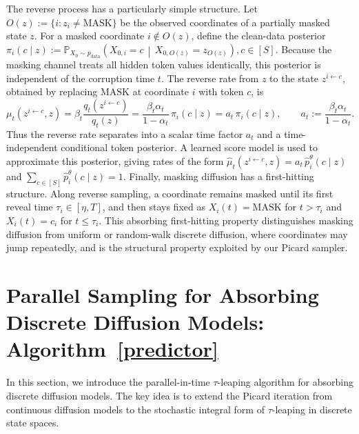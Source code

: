 \documentclass{article}
\begin{document}
The reverse process has a particularly simple structure.  Let $O(z):=\{i:z_i\neq \mathrm{MASK}\}$
be the observed coordinates of a partially masked state \(z\).  For a masked coordinate \(i\notin O(z)\), define the clean-data posterior $\pi_i(c\mid z)
    :=
    \mathbb P_{X_0\sim p_{\mathrm{data}}}
    \!\left(
    X_{0,i}=c
    \,\middle|\,
    X_{0,O(z)}=z_{O(z)}
    \right), c\in[S].$
Because the masking channel treats all hidden token values identically, this posterior is independent of the corruption time \(t\).  The reverse rate from \(z\) to the state \(z^{i\leftarrow c}\), obtained by replacing \(\mathrm{MASK}\) at coordinate \(i\) with token \(c\), is
\[
    \mu_t(z^{i\leftarrow c},z)
    =
    \beta_t\frac{q_t(z^{i\leftarrow c})}{q_t(z)}
    =
    \frac{\beta_t\alpha_t}{1-\alpha_t}\,\pi_i(c\mid z)
    =
    a_t\,\pi_i(c\mid z),
    \qquad
    a_t:=\frac{\beta_t\alpha_t}{1-\alpha_t}.
\]
Thus the reverse rate separates into a scalar time factor \(a_t\) and a time-independent conditional token posterior.  A learned score model is used to approximate this posterior, giving rates of the form $\widehat\mu_t(z^{i\leftarrow c},z)=a_t\,\widehat p^\theta_i(c\mid z)$ and $
    \sum\nolimits_{c\in[S]}\widehat p^\theta_i(c\mid z)=1$.
Finally, masking diffusion has a first-hitting structure.  Along reverse sampling, a coordinate remains masked until its first reveal time \(\tau_i\in[\eta,T]\), and then stays fixed as $X_i(t)=\mathrm{MASK}$ for $t>\tau_i$ and $X_i(t)=c_i$ for $t\le \tau_i$.
This absorbing first-hitting property distinguishes masking diffusion from uniform or random-walk discrete diffusion, where coordinates may jump repeatedly, and is the structural property exploited by our Picard sampler.




\section{Parallel Sampling for Absorbing Discrete Diffusion Models: Algorithm~\ref{predictor}}
\label{sec:parallel-sampling}
In this section, we introduce the parallel-in-time $\tau$-leaping algorithm for absorbing discrete diffusion models. The key idea is to extend the Picard iteration from continuous diffusion models to the stochastic integral form of $\tau$-leaping in discrete state spaces.
\end{document}
